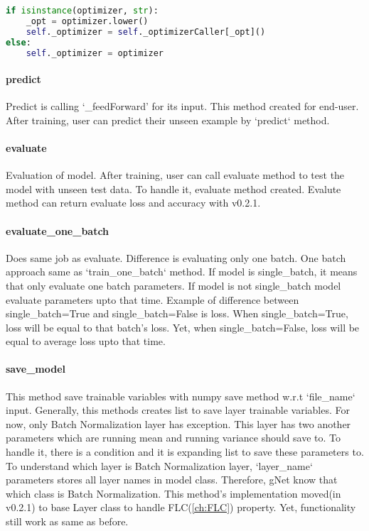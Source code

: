 \documentclass[12pt]{report}
\begin{document}
\begin{lstlisting}[language=Python, numbers=none, caption={Assigning optimizer.}, label={lis:isistance}]
if isinstance(optimizer, str):
	_opt = optimizer.lower()
	self._optimizer = self._optimizerCaller[_opt]()
else:
	self._optimizer = optimizer
\end{lstlisting}

\paragraph{predict}
Predict is calling `\_feedForward' for its input. This method created for end-user. After training, user can predict their unseen example by `predict` method. 

\paragraph{evaluate}
Evaluation of model. After training, user can call evaluate method to test the model with unseen test data. To handle it, evaluate method created. Evalute method can return evaluate loss and accuracy with v0.2.1.

\paragraph{evaluate\_one\_batch}
Does same job as evaluate. Difference is evaluating only one batch. One batch approach same as `train\_one\_batch` method. If model is single\_batch, it means that only evaluate one batch parameters. If model is not single\_batch model evaluate parameters upto that time. Example of difference between single\_batch=True and single\_batch=False is loss. When single\_batch=True, loss will be equal to that batch's loss. Yet, when single\_batch=False, loss will be equal to average loss upto that time. 

\paragraph{save\_model}
This method save trainable variables with numpy save method w.r.t `file\_name` input. Generally, this methods creates list to save layer trainable variables. For now, only Batch Normalization layer has exception. This layer has two another parameters which are running mean and running variance should save to. To handle it, there is a condition and it is expanding list to save these parameters to. To understand which layer is Batch Normalization layer, `layer\_name` parameters stores all layer names in model class. Therefore, gNet know that which class is Batch Normalization. This method's implementation moved(in v0.2.1) to base Layer class to handle FLC(\ref{ch:FLC}) property. Yet, functionality still work as same as before.
\end{document}
